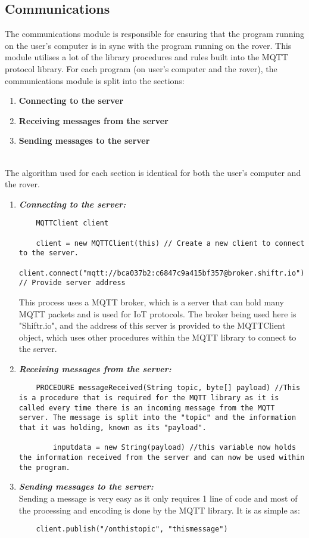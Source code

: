 \documentclass[11pt]{report}
\begin{document}
\subsection{Communications}

The communications module is responsible for ensuring that the program running on the user's computer is in sync with the program running on the rover. This module utilises a lot of the library procedures and rules built into the MQTT protocol library. For each program (on user's computer and the rover), the communications module is split into the sections:
\begin{enumerate}
	\item{\textbf{Connecting to the server}}
	\item{\textbf{Receiving messages from the server}}
	\item{\textbf{Sending messages to the server}}
\end{enumerate}
\noindent
\\
The algorithm used for each section is identical for both the user's computer and the rover. 

\begin{enumerate}
	\item\emph{{\textbf{Connecting to the server:}}}
	\\
	\begin{lstlisting}
	MQTTClient client 
	
	client = new MQTTClient(this) // Create a new client to connect to the server.
	client.connect("mqtt://bca037b2:c6847c9a415bf357@broker.shiftr.io"); // Provide server address
	\end{lstlisting}
	This process uses a MQTT broker, which is a server that can hold many MQTT packets and is used for IoT protocols. The broker being used here is "Shiftr.io", and the address of this server is provided to the MQTTClient object, which uses other procedures within the MQTT library to connect to the server.\\
	\item{\emph{\textbf{Receiving messages from the server:}}}
	\\
	\begin{lstlisting}
	PROCEDURE messageReceived(String topic, byte[] payload) //This is a procedure that is required for the MQTT library as it is called every time there is an incoming message from the MQTT server. The message is split into the "topic" and the information that it was holding, known as its "payload".
	
		inputdata = new String(payload) //this variable now holds the information received from the server and can now be used within the program.
	\end{lstlisting}
	
	\item{\emph{\textbf{Sending messages to the server:}}}
	\\Sending a message is very easy as it only requires 1 line of code and most of the processing and encoding is done by the MQTT library. It is as simple as:
	\begin{lstlisting}
	client.publish("/onthistopic", "thismessage")
	\end{lstlisting}
\end{enumerate}
\end{document}
